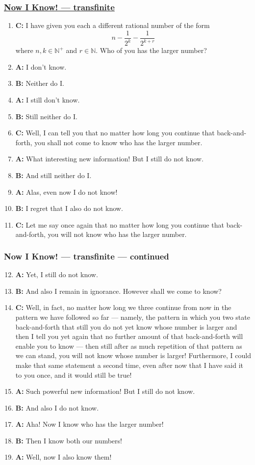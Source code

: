 \documentclass[UTF8,11pt,colorlinks,compress,openany]{beamer}%
\begin{document}
\begin{frame}\frametitle{\href{http://jdh.hamkins.org/now-i-know/}{Now I Know! --- transfinite}}
\vspace{-1ex}
	\begin{enumerate}
		\item \textbf{C:} I have given you each a different rational number of the form \[n-\frac{1}{2^k}-\frac{1}{2^{k+r}}\]
		where $n,k\in\mathbb{N}^+$ and $r\in\mathbb{N}$. Who of you has the larger number?
		\item \textbf{A:} I don't know.
		\item \textbf{B:} Neither do I.
		\item \textbf{A:} I still don't know.
		\item \textbf{B:} Still neither do I.
		\item \textbf{C:} Well, I can tell you that no matter how long you continue that back-and-forth, you shall not come to know who has the larger number.
		\item \textbf{A:} What interesting new information! But I still do not know.
		\item \textbf{B:} And still neither do I.
		\item \textbf{A:} Alas, even now I do not know!
		\item \textbf{B:} I regret that I also do not know.
		\item \textbf{C:} Let me say once again that no matter how long you continue that back-and-forth, you will not know who has the larger number.
	\end{enumerate}
\end{frame}

\begin{frame}\frametitle{Now I Know! --- transfinite --- continued}
	\begin{enumerate}\setcounter{enumi}{11}
		\item \textbf{A:} Yet, I still do not know.
		\item \textbf{B:} And also I remain in ignorance. However shall we come to know?
		\item \textbf{C:} Well, in fact, no matter how long we three continue from now in the pattern we have followed so far --- namely, the pattern in which you two state back-and-forth that still you do not yet know whose number is larger and then I tell you yet again that no further amount of that back-and-forth will enable you to know --- then still after as much repetition of that pattern as we can stand, you will not know whose number is larger! Furthermore, I could make that same statement a second time, even after now that I have said it to you once, and it would still be true!
		\item \textbf{A:} Such powerful new information! But I still do not know.
		\item \textbf{B:} And also I do not know.
		\item \textbf{A:} Aha! Now I know who has the larger number!
		\item \textbf{B:} Then I know both our numbers!
		\item \textbf{A:} Well, now I also know them!
	\end{enumerate}
\end{frame}
\end{document}
